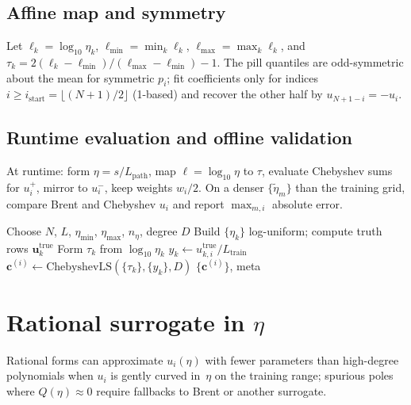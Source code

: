\documentclass[11pt,a4paper]{article}
\begin{document}
\subsection{Affine map and symmetry}
Let $\ell_k=\log_{10}\eta_k$, $\ell_{\min}=\min_k\ell_k$, $\ell_{\max}=\max_k\ell_k$, and $\tau_k = 2(\ell_k-\ell_{\min})/(\ell_{\max}-\ell_{\min})-1$.
The pill quantiles are odd-symmetric about the mean for symmetric $p_i$; fit coefficients only for indices $i\ge i_{\mathrm{start}}=\lfloor (N+1)/2\rfloor$ (1-based) and recover the other half by $u_{N+1-i}=-u_i$.

\subsection{Runtime evaluation and offline validation}
At runtime: form $\eta=s/L_{\mathrm{path}}$, map $\ell=\log_{10}\eta$ to $\tau$, evaluate Chebyshev sums for $u_i^+$, mirror to $u_i^-$, keep weights $w_i/2$.
On a denser $\{\tilde{\eta}_m\}$ than the training grid, compare Brent and Chebyshev $u_i$ and report $\max_{m,i}$ absolute error.

\begin{algorithm}[H]
\caption{Offline Chebyshev build for pill quantiles}
\label{alg:cheb-build}
\begin{algorithmic}[1]
\STATE Choose $N$, $L$, $\eta_{\min}$, $\eta_{\max}$, $n_\eta$, degree $D$
\STATE Build $\{\eta_k\}$ log-uniform; compute truth rows $\mathbf{u}^{\mathrm{true}}_k$
\STATE Form $\tau_k$ from $\log_{10}\eta_k$
  \STATE $y_k \gets u^{\mathrm{true}}_{k,i}/L_{\mathrm{train}}$
  \STATE $\mathbf{c}^{(i)} \gets \mathrm{ChebyshevLS}(\{\tau_k\},\{y_k\},D)$
\ENDFOR
\STATE \RETURN $\{\mathbf{c}^{(i)}\}$, meta
\end{algorithmic}
\end{algorithm}

\section{Rational surrogate in \texorpdfstring{$\eta$}{eta}}
\label{sec:rational-impl}

Rational forms can approximate $u_i(\eta)$ with fewer parameters than high-degree polynomials when $u_i$ is gently curved in~$\eta$ on the training range; spurious poles where $Q(\eta)\approx 0$ require fallbacks to Brent or another surrogate.
\end{document}
